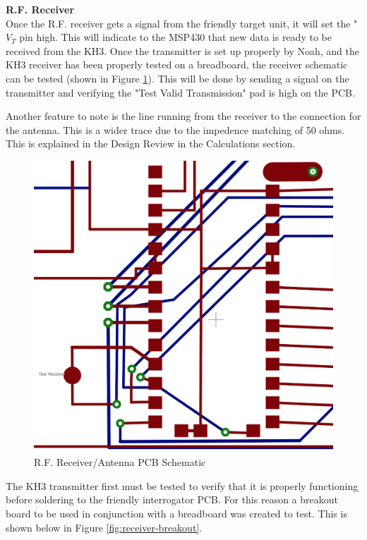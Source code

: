 \documentclass[letterpaper,10pt]{article}
\begin{document}
\begin{spacing}{1.15}
\normalsize\textbf{R.F. Receiver} \\
Once the R.F. receiver gets a signal from the friendly target unit, it will set the "$V_{T}$ pin high. This will indicate to the MSP430 that new data is ready to be received from the KH3. Once the transmitter is set up properly by Noah, and the KH3 receiver has been properly tested on a breadboard, the receiver schematic can be tested (shown in Figure \ref{fig:receiver-pcb}). This will be done by sending a signal on the transmitter and verifying the "Test Valid Transmission" pad is high on the PCB. 

Another feature to note is the line running from the receiver to the connection for the antenna. This is a wider trace due to the impedence matching of 50 ohms. This is explained in the Design Review in the Calculations section. 
\begin{figure} [H]
	\centering
	\includegraphics[scale=0.4]{receiver-antenna-pcb.png}
	\caption{R.F. Receiver/Antenna PCB Schematic\label{fig:receiver-pcb}}
\end{figure}


The KH3 transmitter first must be tested to verify that it is properly functioning before soldering to the friendly interrogator PCB. For this reason a breakout board to be used in conjunction with a breadboard was created to test. This is shown below in Figure \ref{fig:receiver-breakout}.


\end{spacing}
\end{document}
